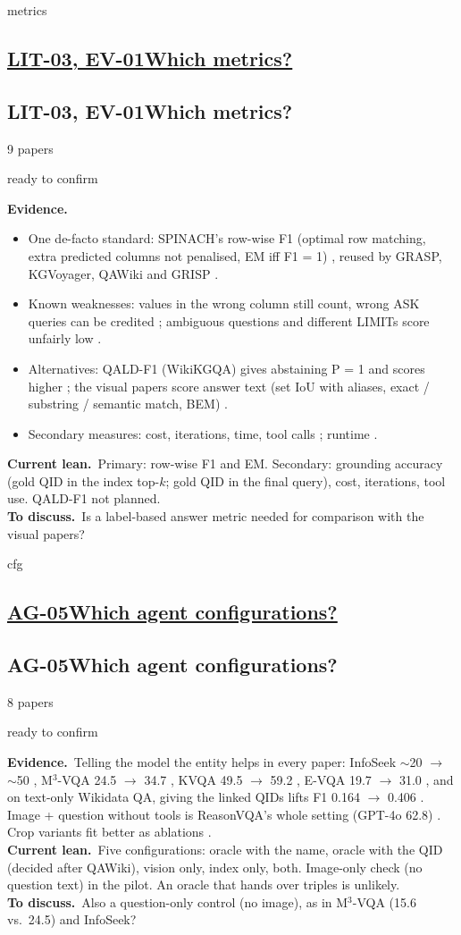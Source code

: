 \documentclass[10pt,a4paper]{article}
\newcommand{\st}[2]{\colorbox{#1}{\footnotesize\strut #2}}
\newcommand{\ready}{\st{green!20}{ready to confirm}}
\newcommand{\qblock}[1][]{\def\qkey{#1}\qblockx}
\newcommand{\qblockx}[4]{%
  \ifx\qkey\empty
  \subsection*{\underline{#1\quad #2}}%
  \else\hypertarget{\qkey}{}
  \subsection*{#1\quad #2}\fi%
{\footnotesize #3 papers\quad}#4\par}
\newcommand{\ev}{\textbf{Evidence.}}
\newcommand{\lean}{\textbf{Current lean.}}
\newcommand{\ask}{\textbf{To discuss.}}
\begin{document}
\qblock[metrics]{LIT-03, EV-01}{Which metrics?}{9}{\ready}
\ev
\begin{itemize}
  \item One de-facto standard: SPINACH's row-wise F1 (optimal row matching,
    extra predicted columns not penalised, EM iff F1 = 1)
    \cite[\S\,5.1]{liu2024spinach}, reused by GRASP, KGVoyager, QAWiki and
    GRISP
    \cite{walter2025grasp,wisam2026kgvoyager,loustaunau2025qawiki,walter2026grisp}.
  \item Known weaknesses: values in the wrong column still count, wrong ASK
    queries can be credited \cite{loustaunau2025qawiki}; ambiguous questions
    and different LIMITs score unfairly low \cite{walter2025grasp}.
  \item Alternatives: QALD-F1 (WikiKGQA) gives abstaining P = 1 and scores
    higher \cite{walter2026grasp}; the visual papers score answer text (set
    IoU with aliases, exact / substring / semantic match, BEM)
    \cite{ma2026m3,tran2025reasonvqa,mensink2023encyclopedic}.
  \item Secondary measures: cost, iterations, time, tool calls
    \cite{wisam2026kgvoyager}; runtime \cite{walter2026grisp}.
\end{itemize}
\lean\ Primary: row-wise F1 and EM. Secondary: grounding accuracy (gold
QID in the index top-$k$; gold QID in the final query), cost, iterations,
tool use. QALD-F1 not planned.\\
\ask\ Is a label-based answer metric needed for comparison with the
visual papers?

\qblock[cfg]{AG-05}{Which agent configurations?}{8}{\ready}
\ev\ Telling the model the entity helps in every paper: InfoSeek
$\sim$20 $\to$ $\sim$50 \cite{chen2023can}, M$^3$-VQA 24.5 $\to$ 34.7
\cite{ma2026m3}, KVQA 49.5 $\to$ 59.2 \cite{shah2019kvqa}, E-VQA 19.7 $\to$
31.0 \cite{mensink2023encyclopedic}, and on text-only Wikidata QA, giving
the linked QIDs lifts F1 0.164 $\to$ 0.406 \cite{loustaunau2025qawiki}.
Image + question without tools is ReasonVQA's whole setting (GPT-4o 62.8)
\cite{tran2025reasonvqa}. Crop variants fit better as ablations
\cite{jian2024large,shen2026sage}.\\
\lean\ Five configurations: oracle with the name, oracle with the QID
(decided after QAWiki), vision only, index only, both. Image-only check
(no question text) in the pilot. An oracle that hands over triples is
unlikely.\\
\ask\ Also a question-only control (no image), as in M$^3$-VQA (15.6 vs.\
24.5) and InfoSeek?
\end{document}
